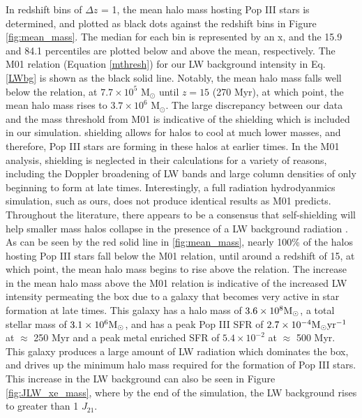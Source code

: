 \documentclass[a4paper,fleqn,usenatbib]{mnras}
\begin{document}
In redshift bins of $\Delta z$ = 1, the mean halo mass hosting Pop III stars is determined, and plotted as black dots against the redshift bins in Figure \ref{fig:mean_mass}. The median for each bin is represented by an x, and the 15.9 and 84.1 percentiles are plotted below and above the mean, respectively. The M01 relation (Equation \ref{mthresh}) for our LW background intensity in Eq. \ref{LWbg} is shown as the black solid line. Notably, the mean halo mass falls well below the relation, at $7.7 \times 10^{5}$ M$_{\odot}$ until $z = 15$ (270 Myr), at which point, the mean halo mass rises to $3.7 \times 10^{6}$ M$_{\odot}$. The large discrepancy between our data and the mass threshold from M01 is indicative of the \hh{} shielding which is included in our simulation. \hh{} shielding allows for halos to cool at much lower masses, and therefore, Pop III stars are forming in these halos at earlier times. In the M01 analysis, \hh{} shielding is neglected in their calculations for a variety of reasons, including the Doppler broadening of LW bands and large column densities of \hh{} only beginning to form at late times. Interestingly, a full radiation hydrodyanmics simulation, such as ours, does not produce identical results as M01 predicts. Throughout the literature, there appears to be a consensus that \hh{} self-shielding will help smaller mass halos collapse in the presence of a LW background radiation \citep[E.g.][]{Yoshida03, Ricotti01, Glover01, Hartwig15}. As can be seen by the red solid line in \ref{fig:mean_mass}, nearly 100\% of the halos hosting Pop III stars fall below the M01 relation, until around a redshift of 15, at which point, the mean halo mass begins to rise above the relation. The increase in the mean halo mass above the M01 relation is indicative of the increased LW intensity permeating the box due to a galaxy that becomes very active in star formation at late times. This galaxy has a halo mass of $3.6 \times 10^{8} \rm M_{\odot}$, a total stellar mass of $3.1 \times 10^{6} \rm M_{\odot}$, and has a peak Pop III SFR of $2.7 \times 10^{-4} \rm M_{\odot} yr^{-1}$ at $\approx$ 250 Myr and a peak metal enriched SFR of $5.4 \times 10^{-2}$ at $\approx$ 500 Myr. This galaxy produces a large amount of LW radiation which dominates the box, and drives up the minimum halo mass required for the formation of Pop III stars. This increase in the LW background can also be seen in Figure \ref{fig:JLW_xe_mass}, where by the end of the simulation, the LW background rises to greater than 1 $J_{21}$.
\end{document}
